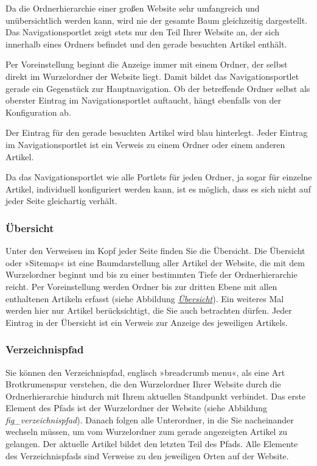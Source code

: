 \documentclass[a4paper,12pt,ngerman]{manual}
\begin{document}
Da die Ordnerhierarchie einer großen Website sehr umfangreich und
unübersichtlich werden kann, wird nie der gesamte Baum gleichzeitig
dargestellt. Das Navigationsportlet zeigt stets nur den Teil Ihrer
Website an, der sich innerhalb eines Ordners befindet und den gerade
besuchten Artikel enthält.

Per Voreinstellung beginnt die Anzeige immer mit einem Ordner, der
selbst direkt im Wurzelordner der Website liegt. Damit bildet das
Navigationsportlet gerade ein Gegenstück zur Hauptnavigation. Ob der
betreffende Ordner selbst als oberster Eintrag im Navigationsportlet
auftaucht, hängt ebenfalls von der Konfiguration ab.

Der Eintrag für den gerade besuchten Artikel wird blau
hinterlegt. Jeder Eintrag im Navigationsportlet ist ein Verweis zu
einem Ordner oder einem anderen Artikel.

Da das Navigationsportlet wie alle Portlets für jeden Ordner, ja sogar
für einzelne Artikel, individuell konfiguriert werden kann, ist es
möglich, dass es sich nicht auf jeder Seite gleichartig verhält.
\hypertarget{sec-sitemap}{}

\subsubsection{Übersicht}

Unter den Verweisen im Kopf jeder Seite finden Sie die Übersicht.  Die
Übersicht oder »Sitemap« ist eine Baumdarstellung aller Artikel der
Website, die mit dem Wurzelordner beginnt und bis zu einer bestimmten
Tiefe der Ordnerhierarchie reicht. Per Voreinstellung werden Ordner
bis zur dritten Ebene mit allen enthaltenen Artikeln erfasst (siehe
Abbildung \hyperlink{fig-sitemap}{\emph{Übersicht}}). Ein weiteres Mal werden hier nur
Artikel berücksichtigt, die Sie auch betrachten dürfen. Jeder Eintrag
in der Übersicht ist ein Verweis zur Anzeige des jeweiligen Artikels.


\subsubsection{Verzeichnispfad}

Sie können den Verzeichnispfad, englisch »breadcrumb menu«, als eine
Art Brotkrumenspur verstehen, die den Wurzelordner Ihrer Website durch
die Ordnerhierarchie hindurch mit Ihrem aktuellen Standpunkt
verbindet. Das erste Element des Pfads ist der Wurzelordner der
Website (siehe Abbildung \emph{fig\_verzeichnispfad}). Danach folgen
alle Unterordner, in die Sie nacheinander wechseln müssen, um vom
Wurzelordner zum gerade angezeigten Artikel zu gelangen. Der aktuelle
Artikel bildet den letzten Teil des Pfads. Alle Elemente des
Verzeichnispfads sind Verweise zu den jeweiligen Orten auf der
Website.
\hypertarget{sec-navigation-lesezeichen}{}
\end{document}
